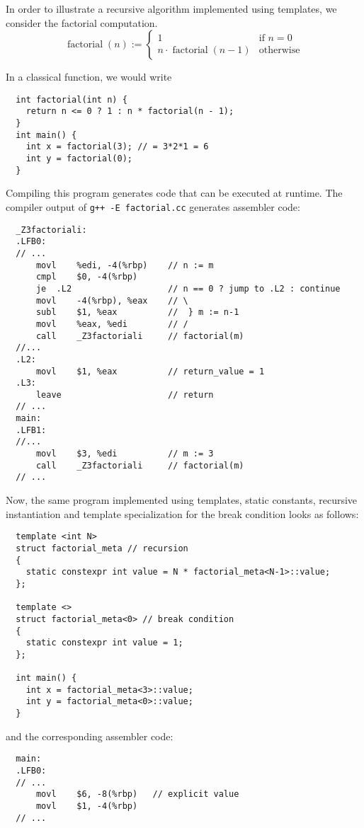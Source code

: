 In order to illustrate a recursive algorithm implemented using templates, we consider the factorial computation.
\[
  \operatorname{factorial}(n) := \left\{\begin{array}{ll} 1 & \text{if }n = 0 \\ n \cdot \operatorname{factorial}(n-1) & \text{otherwise} \end{array}\right.
\]

In a classical function, we would write
\begin{verbatim}
  int factorial(int n) {
    return n <= 0 ? 1 : n * factorial(n - 1);
  }
  int main() {
    int x = factorial(3); // = 3*2*1 = 6
    int y = factorial(0);
  }
\end{verbatim}
Compiling this program generates code that can be executed at runtime.
The compiler output of \texttt{g++ -E factorial.cc} generates assembler code:
\begin{verbatim}
  _Z3factoriali:
  .LFB0:
  // ...
      movl    %edi, -4(%rbp)    // n := m
      cmpl    $0, -4(%rbp)
      je  .L2                   // n == 0 ? jump to .L2 : continue
      movl    -4(%rbp), %eax    // \
      subl    $1, %eax          //  } m := n-1
      movl    %eax, %edi        // /
      call    _Z3factoriali     // factorial(m)
  //...
  .L2:
      movl    $1, %eax          // return_value = 1
  .L3:
      leave                     // return
  // ...
  main:
  .LFB1:
  //...
      movl    $3, %edi          // m := 3
      call    _Z3factoriali     // factorial(m)
  // ...
\end{verbatim}

Now, the same program implemented using templates, static constants, recursive instantiation and template specialization for the break condition
looks as follows:
\begin{verbatim}
  template <int N>
  struct factorial_meta // recursion
  {
    static constexpr int value = N * factorial_meta<N-1>::value;
  };

  template <>
  struct factorial_meta<0> // break condition
  {
    static constexpr int value = 1;
  };

  int main() {
    int x = factorial_meta<3>::value;
    int y = factorial_meta<0>::value;
  }
\end{verbatim}
and the corresponding assembler code:

\begin{verbatim}
  main:
  .LFB0:
  // ...
      movl    $6, -8(%rbp)   // explicit value
      movl    $1, -4(%rbp)
  // ...
\end{verbatim}

